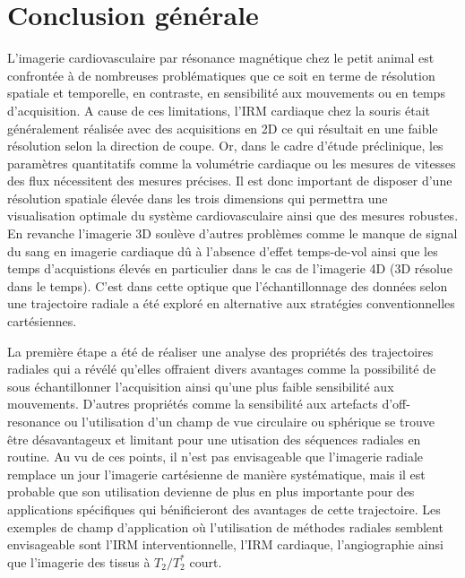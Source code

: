 \chapter{Conclusion générale}

\setlength{\footskip}{50pt}

L'imagerie cardiovasculaire par résonance magnétique chez le petit animal est confrontée à de nombreuses problématiques que ce soit en terme de résolution spatiale et temporelle, en contraste, en sensibilité aux mouvements ou en temps d'acquisition. A cause de ces limitations,  l'IRM cardiaque chez la souris était généralement réalisée avec des acquisitions en 2D ce qui résultait en une faible résolution selon la direction de coupe. Or, dans le cadre d'étude préclinique, les paramètres quantitatifs comme la volumétrie cardiaque ou les mesures de vitesses des flux nécessitent des mesures précises. Il est donc important de disposer d'une résolution spatiale élevée dans les trois dimensions qui permettra une visualisation optimale du système cardiovasculaire ainsi que des mesures robustes. 
En revanche l'imagerie 3D soulève d'autres problèmes comme le manque de signal du sang en imagerie cardiaque dû à l'absence d'effet temps-de-vol ainsi que les temps d'acquistions élevés en particulier dans le cas de l'imagerie 4D (3D résolue dans le temps).
C'est dans cette optique que l'échantillonnage des données selon une trajectoire radiale a été exploré en alternative aux stratégies conventionnelles cartésiennes. 
\medskip

La première étape a été de réaliser une analyse des propriétés des trajectoires radiales qui a révélé qu'elles offraient divers avantages comme la possibilité de sous échantillonner l'acquisition ainsi qu'une plus faible sensibilité aux mouvements. D'autres propriétés comme la sensibilité aux artefacts d'off-resonance ou l'utilisation d'un champ de vue circulaire ou sphérique se trouve être désavantageux et limitant pour une utisation des séquences radiales en routine. Au vu de ces points, il n'est pas envisageable que l'imagerie radiale remplace un jour l'imagerie cartésienne de manière systématique, mais il est probable que son utilisation devienne de plus en plus importante pour des applications spécifiques qui bénificieront des avantages de cette trajectoire. Les exemples de champ d'application où l'utilisation de méthodes radiales semblent envisageable sont l'IRM interventionnelle, l'IRM cardiaque, l'angiographie ainsi que l'imagerie des tissus à $T_2/T_2^*$ court.
\medskip

